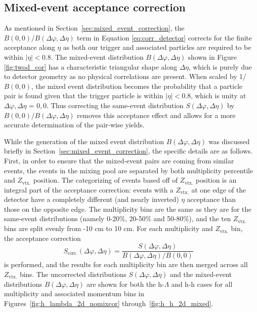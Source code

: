 \subsection{Mixed-event acceptance correction}
As mentioned in Section~\ref{sec:mixed_event_correction}, the $B(0, 0)/B(\Delta\varphi, \Delta\eta)$ term in Equation \ref{eq:corr_detector} corrects for the finite acceptance along $\eta$ as both our trigger and associated particles are required to be within $|\eta| < 0.8$. The mixed-event distribution $B(\Delta\varphi, \Delta\eta)$ shown in Figure \ref{fig:twod_cor} has a characteristic triangular shape along $\Delta\eta$, which is purely due to detector geometry as no physical correlations are present. When scaled by 1/$B(0, 0)$, the mixed event distribution becomes the probability that a particle pair is found given that the trigger particle is within $|\eta| < 0.8$, which is unity at $\Delta\varphi, \Delta\eta$ = $0, 0$. Thus correcting the same-event distribution $S(\Delta\varphi, \Delta\eta)$ by $B(0, 0)/B(\Delta\varphi, \Delta\eta)$ removes this acceptance effect and allows for a more accurate determination of the pair-wise yields. 

While the generation of the mixed event distribution $B(\Delta\varphi, \Delta\eta)$ was discussed briefly in Section~\ref{sec:mixed_event_correction}, the specific details are as follows. First, in order to ensure that the mixed-event pairs are coming from similar events, the events in the mixing pool are separated by both multiplicity percentile and $Z_{\text{vtx.}}$ position. The categorizing of events based off of $Z_{\text{vtx.}}$ position is an integral part of the acceptance correction: events with a $Z_{\text{vtx.}}$ at one edge of the detector have a completely different (and nearly inverted) $\eta$ acceptance than those on the opposite edge. The multiplicity bins are the same as they are for the same-event distributions (namely 0-20\%, 20-50\% and 50-80\%), and the ten $Z_{\text{vtx.}}$ bins are split evenly from -10 cm to 10 cm.  For each multiplicity and $Z_{\text{vtx.}}$ bin, the acceptance correction
%
\begin{equation}
	S_{\text{corr.}}(\Delta\varphi, \Delta\eta) = \frac{S(\Delta\varphi, \Delta\eta)}{B(\Delta\varphi, \Delta\eta)/B(0, 0)}
\end{equation}
%
is performed, and the results for each multiplicity bin are then merged across all $Z_{\text{vtx.}}$ bins. The uncorrected distributions $S(\Delta\varphi, \Delta\eta)$ and the mixed-event distributions $B(\Delta\varphi, \Delta\eta)$ are shown for both the h-$\Lambda$ and h-h cases for all multiplicity and associated momentum bins in Figures~\ref{fig:h_lambda_2d_nomixcor} through~\ref{fig:h_h_2d_mixed}.

